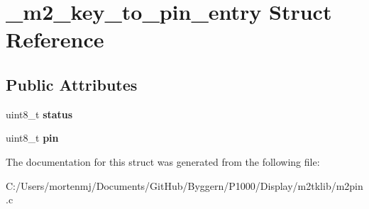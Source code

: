 \hypertarget{struct__m2__key__to__pin__entry}{\section{\-\_\-m2\-\_\-key\-\_\-to\-\_\-pin\-\_\-entry Struct Reference}
\label{struct__m2__key__to__pin__entry}
}
\subsection*{Public Attributes}
\begin{DoxyCompactItemize}
\item 
\hypertarget{struct__m2__key__to__pin__entry_a1821cd3d6c527a3149b0e3d86a2b3f72}{uint8\-\_\-t {\bfseries status}}\label{struct__m2__key__to__pin__entry_a1821cd3d6c527a3149b0e3d86a2b3f72}

\item 
\hypertarget{struct__m2__key__to__pin__entry_a7c541511f0a7fef47e20af031f66a184}{uint8\-\_\-t {\bfseries pin}}\label{struct__m2__key__to__pin__entry_a7c541511f0a7fef47e20af031f66a184}

\end{DoxyCompactItemize}


The documentation for this struct was generated from the following file\-:\begin{DoxyCompactItemize}
\item 
C\-:/\-Users/mortenmj/\-Documents/\-Git\-Hub/\-Byggern/\-P1000/\-Display/m2tklib/m2pin.\-c\end{DoxyCompactItemize}
